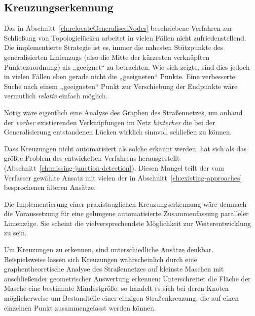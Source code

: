 \documentclass[../main/thesis.tex]{subfiles}
\begin{document}
\subsection{Kreuzungserkennung}
\label{ch:improvements-junction-detection}

Das in Abschnitt~\ref{ch:relocateGeneralisedNodes} beschriebene Verfahren zur Schließung von Topologielücken arbeitet in vielen Fällen nicht zufriedenstellend.
Die implementierte Strategie ist es, immer die nahesten Stützpunkte des generalisierten Linienzugs (also die Mitte der kürzesten verknüpften Punktezuordnung) als „geeignet“ zu betrachten.
Wie sich zeigte, sind dies jedoch in vielen Fällen eben gerade nicht die „geeigneten“ Punkte.
Eine verbesserte Suche nach einem „geeigneten“ Punkt zur Verschiebung der Endpunkte wäre vermutlich \emph{relativ} einfach möglich.

Nötig wäre eigentlich eine Analyse des Graphen des Straßennetzes, um anhand der \emph{vorher} existierenden Verknüpfungen im Netz \emph{hinterher} die bei der Generalisierung entstandenen Lücken wirklich sinnvoll schließen zu können.


Dass Kreuzungen nicht automatisiert als solche erkannt werden, hat sich als das größte Problem des entwickelten Verfahrens herausgestellt (Abschnitt~\ref{ch:missing-junction-detection}).
Diesen Mangel teilt der vom Verfasser gewählte Ansatz mit vielen der in Abschnitt~\ref{ch:existing-approaches} besprochenen älteren Ansätze.

Die Implementierung einer praxistauglichen Kreuzungserkennung wäre demnach die Voraussetzung für eine gelungene automatisierte Zusammenfassung paralleler Linienzüge.
Sie scheint die vielversprechendste Möglichkeit zur Weiterentwicklung zu sein.

Um Kreuzungen zu erkennen, sind unterschiedliche Ansätze denkbar.
Beispielsweise lassen sich Kreuzungen wahrscheinlich durch eine graphentheoretische Analyse des Straßennetzes auf kleinste Maschen mit anschließender geometrischer Auswertung erkennen:
Unterschreitet die Fläche der Masche eine bestimmte Mindestgröße, so handelt es sich bei deren Knoten möglicherweise um Bestandteile einer einzigen Straßenkreuzung, die auf einen einzelnen Punkt zusammengefasst werden können.
\end{document}
